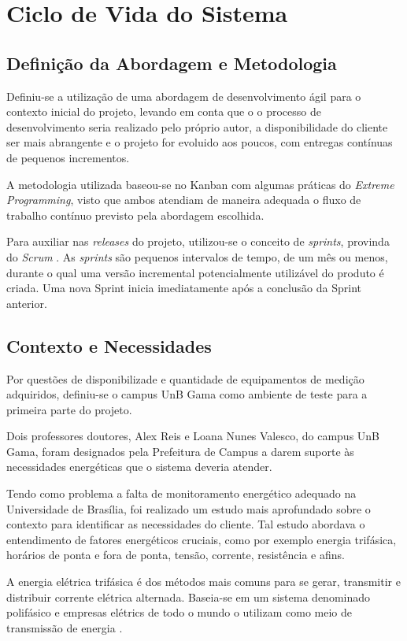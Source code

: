 \chapter{Ciclo de Vida do Sistema}
\section{Definição da Abordagem e Metodologia}
Definiu-se a utilização de uma abordagem de desenvolvimento ágil \cite{beck2001agile} para o contexto inicial do projeto, levando em conta que o o processo de desenvolvimento seria realizado pelo próprio autor, a disponibilidade do cliente ser mais abrangente e o projeto for evoluido aos poucos, com entregas contínuas de pequenos incrementos.

A metodologia utilizada baseou-se no Kanban \cite{radigan_2015} com algumas práticas do \textit{Extreme Programming}, visto que ambos atendiam de maneira adequada o fluxo de trabalho contínuo previsto pela abordagem escolhida.

Para auxiliar nas \textit{releases} do projeto, utilizou-se o conceito de \textit{sprints}, provinda do \textit{Scrum} \cite{scrum_guide}. As \textit{sprints} são pequenos intervalos de tempo, de um mês ou menos, durante o qual uma versão incremental potencialmente utilizável do produto é criada. Uma nova Sprint inicia imediatamente após a conclusão da Sprint anterior.

\section{Contexto e Necessidades}
Por questões de disponibilizade e quantidade de equipamentos de medição adquiridos, definiu-se o campus UnB Gama como ambiente de teste para a primeira parte do projeto.

Dois professores doutores, Alex Reis e Loana Nunes Valesco, do campus UnB Gama, foram designados pela Prefeitura de Campus a darem suporte às necessidades energéticas que o sistema deveria atender.

Tendo como problema a falta de monitoramento energético adequado na Universidade de Brasília, foi realizado um estudo mais aprofundado sobre o contexto para identificar as necessidades do cliente. Tal estudo abordava o entendimento de fatores energéticos cruciais, como por exemplo energia trifásica, horários de ponta e fora de ponta, tensão, corrente, resistência e afins.

A energia elétrica trifásica é dos métodos mais comuns para se gerar, transmitir e distribuir corrente elétrica alternada. Baseia-se em um sistema denominado polifásico e empresas elétrics de todo o mundo o utilizam como meio de transmissão de energia \cite{stevenson_1962}.

